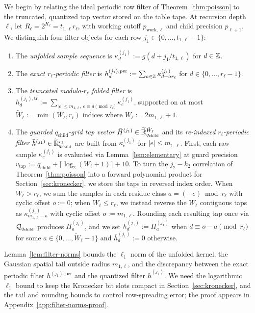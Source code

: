 We begin by relating the ideal periodic row filter of Theorem~\ref{thm:poisson} to the truncated, quantized tap vector stored on the table tape. At recursion depth $\ell$, let $R_\ell = 2^{K_\ell} = t_{1,\ell} r_\ell$, with working cutoff $p_{\mathrm{work},\ell}$ and child precision $p_{\ell+1}$. We distinguish four filter objects for each row $j_1 \in \{0, \dots, t_{1,\ell}-1\}$:
\begin{enumerate}[label=(\alph*),leftmargin=*]
  \item The \emph{unfolded sample sequence} is $\kappa^{(j_1)}_d := g(d + j_1/t_{1,\ell})$ for $d \in \mathbb{Z}$.
  \item The \emph{exact $r_\ell$-periodic filter} is $h^{(j_1),\mathrm{per}}_d := \sum_{a \in \mathbb{Z}} \kappa^{(j_1)}_{d + a r_\ell}$ for $d \in \{0, \dots, r_\ell-1\}$.
  \item The \emph{truncated modulo-$r_\ell$ folded filter} is $h^{(j_1),\mathrm{tr}}_d := \sum_{|e| \le m_{1,\ell}, \, e \equiv d \pmod{r_\ell}} \kappa^{(j_1)}_e$, supported on at most $\tilde{W}_\ell := \min(W_\ell, r_\ell)$ indices where $W_\ell := 2 m_{1,\ell} + 1$.
  \item The \emph{guarded $q_{\mathrm{child}}$-grid tap vector} $\bar{H}^{(j_1)} \in \widetilde{\mathbb{R}}_{q_{\mathrm{child}}}^{\tilde{W}_\ell}$ and its \emph{re-indexed $r_\ell$-periodic filter} $\bar{h}^{(j_1)} \in \widetilde{\mathbb{R}}_{q_{\mathrm{child}}}^{r_\ell}$ are built from $\kappa^{(j_1)}_e$ for $|e| \le m_{1,\ell}$. First, each raw sample $\kappa^{(j_1)}_e$ is evaluated via Lemma~\ref{lem:elementary} at guard precision $v_{\mathrm{tap}} := q_{\mathrm{child}} + \lceil \log_2(W_\ell + 1) \rceil + 10$. To turn the $j_2 - k_2$ correlation of Theorem~\ref{thm:poisson} into a forward polynomial product for Section~\ref{sec:kronecker}, we store the taps in reversed index order. When $W_\ell > r_\ell$, we sum the samples in each residue class $a = (-e) \bmod r_\ell$ with cyclic offset $o := 0$; when $W_\ell \le r_\ell$, we instead reverse the $W_\ell$ contiguous taps as $\kappa^{(j_1)}_{m_{1,\ell} - a}$ with cyclic offset $o := m_{1,\ell}$. Rounding each resulting tap once via $\mathcal{Q}_{q_{\mathrm{child}}}$ produces $\bar{H}^{(j_1)}_a$, and we set $\bar{h}^{(j_1)}_d := \bar{H}^{(j_1)}_a$ when $d \equiv o - a \pmod{r_\ell}$ for some $a \in \{0, \dots, \tilde{W}_\ell - 1\}$ and $\bar{h}^{(j_1)}_d := 0$ otherwise.
\end{enumerate}

Lemma~\ref{lem:filter-norms} bounds the $\ell_1$ norm of the unfolded kernel, the Gaussian spatial tail outside radius $m_{1,\ell}$, and the discrepancy between the exact periodic filter $h^{(j_1),\mathrm{per}}$ and the quantized filter $\bar{h}^{(j_1)}$. We need the logarithmic $\ell_1$ bound to keep the Kronecker bit slots compact in Section~\ref{sec:kronecker}, and the tail and rounding bounds to control row-spreading error; the proof appears in Appendix~\ref{app:filter-norms-proof}.

